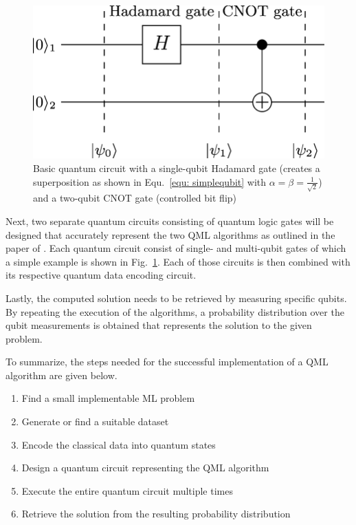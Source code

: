 \documentclass[a4paper]{article}
\newcommand*{\0}{$\ket{0}$}
\newcommand*{\1}{$\ket{1}$}
\begin{document}
\begin{figure}[!ht]
      \centering
       \includegraphics[scale=0.25]{qcircuit.png}
       \caption[caption for qcircuit]{\label{fig:qcircuit} Basic quantum circuit with a single-qubit Hadamard gate (creates a superposition as shown in Equ.~\ref{equ: simplequbit} with $\alpha=\beta=\frac{1}{\sqrt{2}}$) and a two-qubit CNOT gate (controlled bit flip)\footnotemark[2]}
\end{figure}


Next, two separate quantum circuits consisting of quantum logic gates will be designed that accurately represent the two QML algorithms as outlined in the paper of \cite{Schuld2014, Schuld2016}. Each quantum circuit consist of single- and multi-qubit gates of which a simple example is shown in Fig.~\ref{fig:qcircuit}. Each of those circuits is then combined with its respective quantum data encoding circuit.

Lastly, the computed solution needs to be retrieved by measuring specific qubits. By repeating the execution of the algorithms, a probability distribution over the qubit measurements is obtained that represents the solution to the given problem.

To summarize, the steps needed for the successful implementation of a QML algorithm are given below.

\begin{enumerate}
\item Find a small implementable ML problem
\item Generate or find a suitable dataset
\item Encode the classical data into quantum states
\item Design a quantum circuit representing the QML algorithm
\item Execute the entire quantum circuit multiple times
\item Retrieve the solution from the resulting probability distribution
\end{enumerate}
\end{document}
